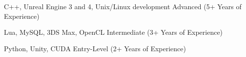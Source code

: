

\begin{cvhonors}

  \cvhonor
	{} %
	{C++, Unreal Engine 3 and 4, Unix/Linux development} %
    {} %
    {Advanced (5+ Years of Experience)} %

  \cvhonor
	{} %
    {Lua, MySQL, 3DS Max, OpenCL} %
    {} %
    {Intermediate (3+ Years of Experience)} %

  \cvhonor
	{}
	{Python, Unity, CUDA}
	{}
	{Entry-Level (2+ Years of Experience)}

\end{cvhonors}
